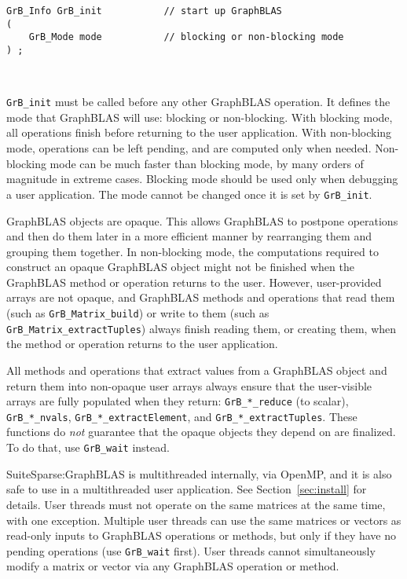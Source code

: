 \documentclass[12pt]{article}
\begin{document}
\begin{mdframed}[userdefinedwidth=6in]
{\footnotesize
\begin{verbatim}
GrB_Info GrB_init           // start up GraphBLAS
(
    GrB_Mode mode           // blocking or non-blocking mode
) ;
\end{verbatim}
}\end{mdframed}

\hypertarget{link:init}{\mbox{ }}%
\verb'GrB_init' must be called before any other GraphBLAS operation.  It
defines the mode that GraphBLAS will use:  blocking or non-blocking.  With
blocking mode, all operations finish before returning to the user application.
With non-blocking mode, operations can be left pending, and are computed only
when needed.  Non-blocking mode can be much faster than blocking mode, by many
orders of magnitude in extreme cases.  Blocking mode should be used only when
debugging a user application.  The mode cannot be changed once it is set by
\verb'GrB_init'.

GraphBLAS objects are opaque.  This allows GraphBLAS to
postpone operations and then do them later in a more efficient manner by
rearranging them and grouping them together.  In non-blocking mode, the
computations required to construct an opaque GraphBLAS object might not be
finished when the GraphBLAS method or operation returns to the user.  However,
user-provided arrays are not opaque, and GraphBLAS methods and operations that
read them (such as \verb'GrB_Matrix_build') or write to them (such as
\verb'GrB_Matrix_extractTuples') always finish reading them, or creating them,
when the method or operation returns to the user application.

All methods and operations that extract values from a GraphBLAS object and
return them into non-opaque user arrays always ensure that the user-visible
arrays are fully populated when they return: \verb'GrB_*_reduce' (to scalar),
\verb'GrB_*_nvals', \verb'GrB_*_extractElement', and
\verb'GrB_*_extractTuples'.  These functions do {\em not} guarantee that the
opaque objects they depend on are finalized.  To do that, use
\verb'GrB_wait' instead.

SuiteSparse:GraphBLAS is multithreaded internally, via OpenMP, and it is also
safe to use in a multithreaded user application.  See Section~\ref{sec:install}
for details.
User threads must not operate on the same matrices at the same time, with one
exception.  Multiple user threads can use the same matrices or vectors as
read-only inputs to GraphBLAS operations or methods, but only if they have no
pending operations (use \verb'GrB_wait'
first).  User threads cannot simultaneously modify a matrix or vector via any
GraphBLAS operation or method.
\end{document}
